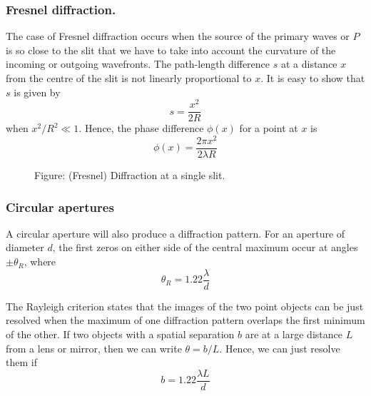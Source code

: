 \documentclass[../../../main.tex]{subfiles}
\begin{document}
\subsubsection{Fresnel diffraction.} The case of Fresnel diffraction occurs when the source of the primary waves or $P$ is so close to the slit that we have to take into account the curvature of the incoming or outgoing wavefronts. The path-length difference $s$ at a distance $x$ from the centre of the slit is not linearly proportional to $x$. It is easy to show that $s$ is given by
\begin{equation*}
    s=\frac{x^2}{2R}
\end{equation*}
when $x^2/R^2 \ll 1$. Hence, the phase difference $\phi(x)$ for a point at $x$ is
\begin{equation*}
    \phi(x)=\frac{2\pi x^2}{2\lambda R}
\end{equation*}

\begin{figure*}
    \centering
    \caption*{Figure: (Fresnel) Diffraction at a single slit.}
\end{figure*}

\subsubsection{Circular apertures}
A circular aperture will also produce a diffraction pattern. For an aperture of diameter $d$, the ﬁrst zeros on either side of the central maximum occur at angles $\pm \theta_R$, where
\begin{equation*}
    \theta_R=1.22\frac{\lambda}{d}
\end{equation*}

The Rayleigh criterion states that the images of the two point objects can be just resolved when the maximum of one diffraction pattern overlaps the ﬁrst minimum of the other. If two objects with a spatial separation $b$ are at a large distance $L$ from a lens or mirror, then we can write $\theta = b/L.$ Hence, we can just resolve them if
\begin{equation*}
    b=1.22\frac{\lambda L}{d}
\end{equation*}
\end{document}

